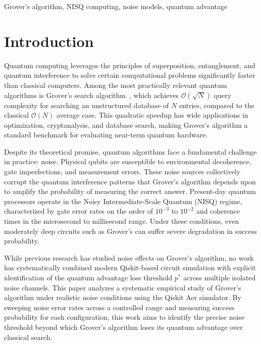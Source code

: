 \documentclass[conference]{IEEEtran}
\begin{document}
\begin{IEEEkeywords}
Grover's algorithm, NISQ computing, noise models, quantum advantage
\end{IEEEkeywords}

\section{Introduction}

Quantum computing leverages the principles of superposition, entanglement, and
quantum interference to solve certain computational problems significantly faster
than classical computers. Among the most practically relevant quantum algorithms
is Grover's search algorithm~\cite{grover1996}, which achieves
$\mathcal{O}(\sqrt{N})$ query complexity for searching an unstructured database
of $N$ entries, compared to the classical $\mathcal{O}(N)$ average case. This
quadratic speedup has wide applications in optimization, cryptanalysis, and
database search, making Grover's algorithm a standard benchmark for evaluating
near-term quantum hardware.

Despite its theoretical promise, quantum algorithms face a fundamental challenge
in practice: noise. Physical qubits are susceptible to environmental decoherence,
gate imperfections, and measurement errors. These noise sources collectively
corrupt the quantum interference patterns that Grover's algorithm depends upon to
amplify the probability of measuring the correct answer. Present-day quantum
processors operate in the Noisy Intermediate-Scale Quantum (NISQ) regime,
characterized by gate error rates on the order of $10^{-3}$ to $10^{-2}$ and
coherence times in the microsecond to millisecond range. Under these conditions,
even moderately deep circuits such as Grover's can suffer severe degradation in
success probability.

While previous research has studied noise effects on Grover's algorithm, no work
has systematically combined modern Qiskit-based circuit simulation with explicit
identification of the quantum advantage loss threshold $p^{*}$ across multiple
isolated noise channels. This paper analyzes a systematic empirical study of
Grover's algorithm under realistic noise conditions using the Qiskit Aer
simulator. By sweeping noise error rates across a controlled range and measuring
success probability for each configuration, this work aims to identify the precise
noise threshold beyond which Grover's algorithm loses its quantum advantage over
classical search.
\end{document}
